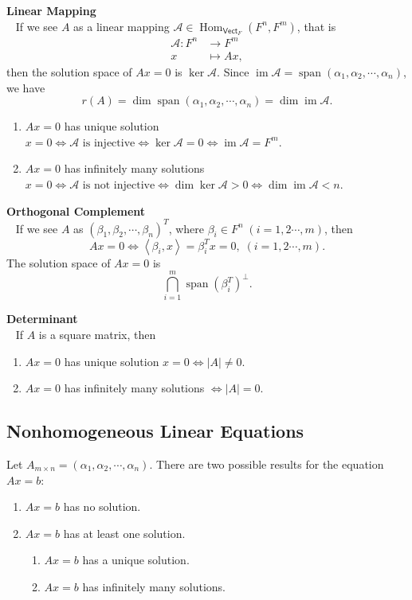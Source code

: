 \documentclass{report}
\theoremstyle{nonumberplain}
\begin{document}
\noindent\textbf{Linear Mapping}\\~
If we see $A$ as a linear mapping $\mathcal{A}\in\operatorname{Hom}_{\mathsf{Vect}_F}(F^n,F^m)$, that is
\begin{align*}
	\mathcal{A}:F^n&\longrightarrow F^m\\
	x&\longmapsto Ax,
\end{align*}
then the solution space of $Ax=0$ is $\ker\mathcal{A}$. Since $\operatorname{im}\mathcal{A}=\operatorname{span}(\alpha_1,\alpha_2,\cdots,\alpha_n)$, we have
\[
	r(A)=\dim\operatorname{span}(\alpha_1,\alpha_2,\cdots,\alpha_n)=\dim\operatorname{im}\mathcal{A}.
\]
\begin{enumerate}
	\item $Ax=0$ has unique solution $x=0\iff\mathcal{A}\text{ is injective}\iff\ker\mathcal{A}=0\iff \operatorname{im}\mathcal{A}=F^m$.
	\item $Ax=0$ has infinitely many solutions $x=0\iff\mathcal{A}\text{ is not injective}\iff\dim\ker\mathcal{A}>0\iff \dim\operatorname{im}\mathcal{A}<n$.
\end{enumerate}

\noindent\textbf{Orthogonal Complement}\\~
If we see $A$ as $(\beta_1,\beta_2,\cdots,\beta_n)^T$, where $\beta_i\in F^n\;(i=1,2\cdots,m)$, then 
\[
	Ax=0\iff \left\langle\beta_i,x\right\rangle=\beta_i^Tx=0,\;\left(i=1,2\cdots,m\right).
\]
The solution space of $Ax=0$ is
\[
	\bigcap_{i=1}^m\operatorname{span}\left(\beta_i^T\right)^{\perp}.\]

\noindent\textbf{Determinant}\\~
If $A$ is a square matrix, then
\begin{enumerate}
	\item $Ax=0$ has unique solution $x=0\iff \left|A\right|\ne 0$.
	\item $Ax=0$ has infinitely many solutions $\iff \left|A\right|=0$.
\end{enumerate}

\subsection{Nonhomogeneous Linear Equations}
Let $A_{m\times n}=(\alpha_1,\alpha_2,\cdots,\alpha_n)$. There are two possible results for the equation $Ax=b$:
\begin{enumerate}
	\item $Ax=b$ has no solution.
	\item $Ax=b$ has at least one solution.
	\begin{enumerate}
		\item $Ax=b$ has a unique solution.
		\item $Ax=b$ has infinitely many solutions.
	\end{enumerate}
\end{enumerate}
\end{document}
